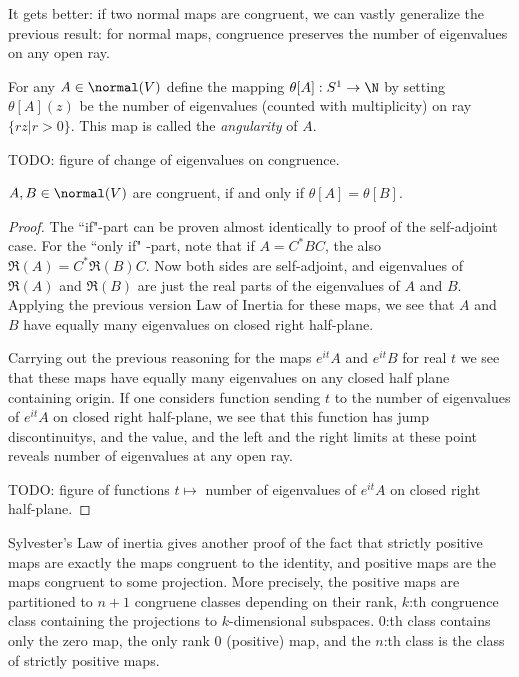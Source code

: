 It gets better: if two normal maps are congruent, we can vastly generalize the previous result: for normal maps, congruence preserves the number of eigenvalues on any open ray.

For any $A \in \normal(V)$ define the mapping $\theta[A] : S^{1} \to \N$ by setting $\theta[A](z)$ be the number of eigenvalues (counted with multiplicity) on ray $\{rz | r > 0\}$. This map is called the \textit{angularity} of $A$.

TODO: figure of change of eigenvalues on congruence.

\begin{lause}
	$A, B \in \normal(V)$ are congruent, if and only if $\theta[A] = \theta[B]$.
\end{lause}
\begin{proof}
	The ``if"-part can be proven almost identically to proof of the self-adjoint case. For the ``only if" -part, note that if $A = C^{*}BC$, the also $\Re(A) = C^{*}\Re(B)C$. Now both sides are self-adjoint, and eigenvalues of $\Re(A)$ and $\Re(B)$ are just the real parts of the eigenvalues of $A$ and $B$. Applying the previous version Law of Inertia for these maps, we see that $A$ and $B$ have equally many eigenvalues on closed right half-plane. 

	Carrying out the previous reasoning for the maps $e^{i t}A$ and $e^{i t} B$ for real $t$ we see that these maps have equally many eigenvalues on any closed half plane containing origin. If one considers function sending $t$ to the number of eigenvalues of $e^{i t} A$ on closed right half-plane, we see that this function has jump discontinuitys, and the value, and the left and the right limits at these point reveals number of eigenvalues at any open ray.

	TODO: figure of functions $t \mapsto$ number of eigenvalues of $e^{it}A$ on closed right half-plane.
\end{proof}

Sylvester's Law of inertia gives another proof of the fact that strictly positive maps are exactly the maps congruent to the identity, and positive maps are the maps congruent to some projection. More precisely, the positive maps are partitioned to $n + 1$ congruene classes depending on their rank, $k$:th congruence class containing the projections to $k$-dimensional subspaces. $0$:th class contains only the zero map, the only rank $0$ (positive) map, and the $n$:th class is the class of strictly positive maps.


